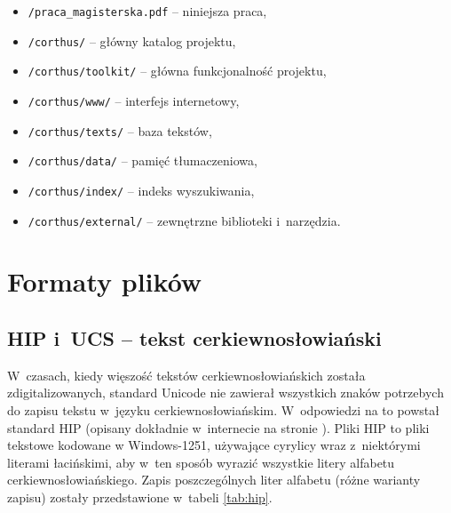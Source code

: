 \documentclass{pracamgr}
\begin{document}
\begin{itemize}
\item {\tt /praca\_magisterska.pdf} -- niniejsza praca,
\item {\tt /corthus/} -- główny katalog projektu,
\item {\tt /corthus/toolkit/} -- główna funkcjonalność projektu,
\item {\tt /corthus/www/} -- interfejs internetowy,
\item {\tt /corthus/texts/} -- baza tekstów,
\item {\tt /corthus/data/} -- pamięć tłumaczeniowa,
\item {\tt /corthus/index/} -- indeks wyszukiwania,
\item {\tt /corthus/external/} -- zewnętrzne biblioteki i~narzędzia.
\end{itemize}


\chapter{Formaty plików}\label{r:formaty}

\section{HIP i~UCS -- tekst cerkiewno\-{}słowiański}
\label{encoding}

W~czasach, kiedy więszość tekstów cerkiewno\-{}słowiańskich została
zdigitalizowanych, standard Unicode nie zawierał wszystkich znaków
potrzebych do zapisu tekstu w~języku cerkiewno\-{}słowiańskim.
W~odpowiedzi na to powstał standard HIP (opisany dokładnie w~internecie
na stronie \cite{hip}). Pliki HIP to pliki tekstowe kodowane w
Windows-1251, używające cyrylicy wraz z~niektórymi literami
łacińskimi, aby w~ten sposób wyrazić wszystkie litery alfabetu
cerkiewno\-{}słowiańskiego. Zapis poszczególnych liter alfabetu (różne
warianty zapisu) zostały przedstawione w~tabeli \ref{tab:hip}.
\end{document}
